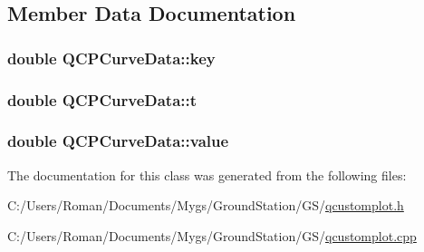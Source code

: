 \subsection{Member Data Documentation}
\hypertarget{class_q_c_p_curve_data_a8a4ec5f2b9a396149fd842e309701bd4}{}
\subsubsection[{key}]{\setlength{\rightskip}{0pt plus 5cm}double Q\+C\+P\+Curve\+Data\+::key}\label{class_q_c_p_curve_data_a8a4ec5f2b9a396149fd842e309701bd4}
\hypertarget{class_q_c_p_curve_data_aecc395525be28e9178a088793beb3ff3}{}
\subsubsection[{t}]{\setlength{\rightskip}{0pt plus 5cm}double Q\+C\+P\+Curve\+Data\+::t}\label{class_q_c_p_curve_data_aecc395525be28e9178a088793beb3ff3}
\hypertarget{class_q_c_p_curve_data_a72b39b8e1dbf7b45382ebd48419b6828}{}
\subsubsection[{value}]{\setlength{\rightskip}{0pt plus 5cm}double Q\+C\+P\+Curve\+Data\+::value}\label{class_q_c_p_curve_data_a72b39b8e1dbf7b45382ebd48419b6828}


The documentation for this class was generated from the following files\+:\begin{DoxyCompactItemize}
\item 
C\+:/\+Users/\+Roman/\+Documents/\+Mygs/\+Ground\+Station/\+G\+S/\hyperlink{qcustomplot_8h}{qcustomplot.\+h}\item 
C\+:/\+Users/\+Roman/\+Documents/\+Mygs/\+Ground\+Station/\+G\+S/\hyperlink{qcustomplot_8cpp}{qcustomplot.\+cpp}\end{DoxyCompactItemize}
